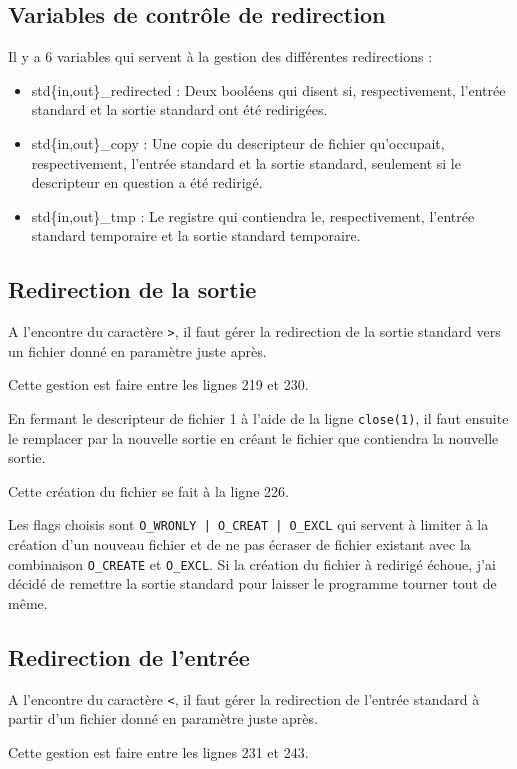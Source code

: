 \documentclass[a4paper,10pt]{article}
\begin{document}
\subsection{Variables de contrôle de redirection}
Il y a 6 variables qui servent à la gestion des différentes redirections :
\begin{itemize}
 \item std\{in,out\}\_redirected : Deux booléens qui disent si, respectivement, l'entrée standard et la sortie standard ont été redirigées.
 \item std\{in,out\}\_copy : Une copie du descripteur de fichier qu'occupait, respectivement, l'entrée standard et la sortie standard, seulement si le descripteur en question a été redirigé.
 \item std\{in,out\}\_tmp : Le registre qui contiendra le, respectivement, l'entrée standard temporaire et la sortie standard temporaire.
\end{itemize}
\pagebreak
\subsection{Redirection de la sortie}
A l'encontre du caractère \verb?>?, il faut gérer la redirection de la sortie standard vers un fichier donné en paramètre juste après.

Cette gestion est faire entre les lignes 219 et 230.

En fermant le descripteur de fichier 1 à l'aide de la ligne \verb?close(1)?, il faut ensuite le remplacer par la nouvelle sortie en créant le fichier que contiendra la nouvelle sortie.

Cette création du fichier se fait à la ligne 226.

Les flags choisis sont \verb?O_WRONLY | O_CREAT | O_EXCL? qui servent à limiter à la création d'un nouveau fichier et de ne pas écraser de fichier existant avec la combinaison \verb?O_CREATE? et \verb?O_EXCL?. Si la création du fichier à redirigé échoue, j'ai décidé de remettre la sortie standard pour laisser le programme tourner tout de même.

\subsection{Redirection de l'entrée}
A l'encontre du caractère \verb?<?, il faut gérer la redirection de l'entrée standard à partir d'un fichier donné en paramètre juste après.

Cette gestion est faire entre les lignes 231 et 243.
\end{document}
